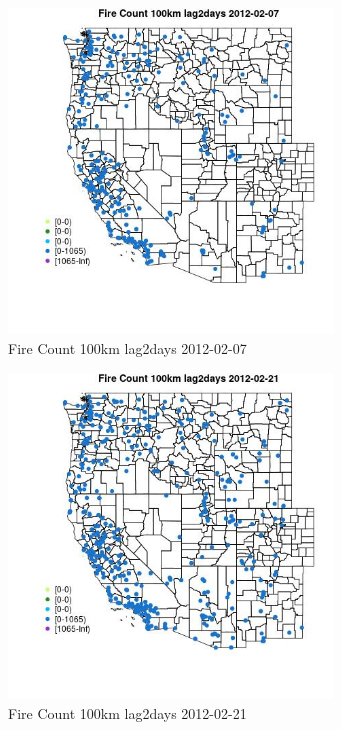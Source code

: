 \begin{figure} 
\centering  
\includegraphics[width=0.77\textwidth]{Code_Outputs/Report_ML_input_PM25_Step4_part_f_de_duplicated_aves_prioritize_24hr_obswNAs_MapObsFire_Count_100km_lag2days2012-02-07.jpg} 
\caption{\label{fig:Report_ML_input_PM25_Step4_part_f_de_duplicated_aves_prioritize_24hr_obswNAsMapObsFire_Count_100km_lag2days2012-02-07}Fire Count 100km lag2days 2012-02-07} 
\end{figure} 
 

\begin{figure} 
\centering  
\includegraphics[width=0.77\textwidth]{Code_Outputs/Report_ML_input_PM25_Step4_part_f_de_duplicated_aves_prioritize_24hr_obswNAs_MapObsFire_Count_100km_lag2days2012-02-21.jpg} 
\caption{\label{fig:Report_ML_input_PM25_Step4_part_f_de_duplicated_aves_prioritize_24hr_obswNAsMapObsFire_Count_100km_lag2days2012-02-21}Fire Count 100km lag2days 2012-02-21} 
\end{figure} 
 

